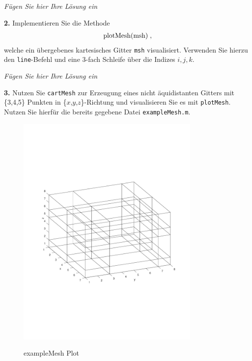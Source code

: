 \documentclass[Protokollheft.tex]{subfiles}
\begin{document}
\emph{Fügen Sie hier Ihre Lösung ein}

        \begin{framed}
	\noindent \textbf{2.} Implementieren Sie die Methode
                    \begin{align}
                        \lstinline{plotMesh(msh)} \; ,
                    \end{align}
                    welche ein übergebenes kartesisches Gitter \lstinline{msh} visualisiert. Verwenden
                    Sie hierzu den \lstinline{line}-Befehl und eine 3-fach Schleife über die Indizes $i,j,k$.\label{exer:plotMesh}
\end{framed}

\emph{Fügen Sie hier Ihre Lösung ein}

        \begin{framed}
	\noindent \textbf{3.} Nutzen Sie \lstinline{cartMesh} zur Erzeugung eines nicht äquidistanten Gitters mit \{3,4,5\} Punkten in \{$x$,$y$,$z$\}-Richtung und visualisieren Sie es mit \lstinline{plotMesh}. Nutzen Sie hierfür die bereits gegebene Datei \lstinline{exampleMesh.m}.\label{exer:createVisualizeMesh}
\end{framed}

	\begin{figure}[h]
	\centering
	\includegraphics[trim = 15mm 65mm 15mm 60mm, clip,width=0.8\textwidth]{exmesh.pdf}
	\label{abb:example}
	\caption{exampleMesh Plot}
\end{figure}
\end{document}
